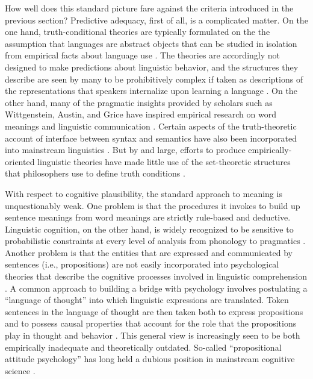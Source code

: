 How well does this standard picture fare against the criteria introduced in the previous section? Predictive adequacy, first of all, is a complicated matter. On the one hand, truth-conditional theories are typically formulated on the the assumption that languages are abstract objects that can be studied in isolation from empirical facts about language use \citep[][]{Lewis:1970, Jackendoff:2002, Speaks:2014}. The theories are accordingly not designed to make predictions about linguistic behavior, and the structures they describe are seen by many to be prohibitively complex if taken as descriptions of the representations that speakers internalize upon learning a language \citep{Jackendoff:2002,LiangPotts:2015}. On the other hand, many of the pragmatic insights provided by scholars such as Wittgenstein, Austin, and Grice have inspired empirical research on word meanings and linguistic communication \citep{Pinker:1994,Bloom:2001,Harley:2014}. Certain aspects of the truth-theoretic account of interface between syntax and semantics have also been incorporated into mainstream linguistics \citep{SmolenskyLegendre:2006}. But by and large, efforts to produce empirically-oriented linguistic theories have made little use of the set-theoretic structures that philosophers use to define truth conditions \citep{Jackendoff:2002,Harley:2014}. 

With respect to cognitive plausibility, the standard approach to meaning is unquestionably weak. One problem is that the procedures it invokes to build up sentence meanings from word meanings are strictly rule-based and deductive. Linguistic cognition, on the other hand, is widely recognized to be sensitive to probabilistic constraints at every level of analysis from phonology to pragmatics  \citep{SmolenskyLegendre:2006,Christiansen:2015,ChaterManning:2006,Seidenberg:1997}. Another problem is that the entities that are expressed and communicated by sentences (i.e., propositions) are not easily incorporated into psychological theories that describe the cognitive processes involved in linguistic comprehension \citep[][Ch. 5]{Dennett:1987}. A common approach to building a bridge with psychology involves postulating a ``language of thought'' into which linguistic expressions are translated. Token sentences in the language of thought are then taken both to express propositions and to possess causal properties that account for the role that the propositions play in thought and behavior \citep{Fodor:1998}. This general view is increasingly seen to be both empirically inadequate and theoretically outdated. So-called ``propositional attitude psychology'' has long held a dubious position in mainstream cognitive science \citep{Dennett:1987,Churchland:1993}.

